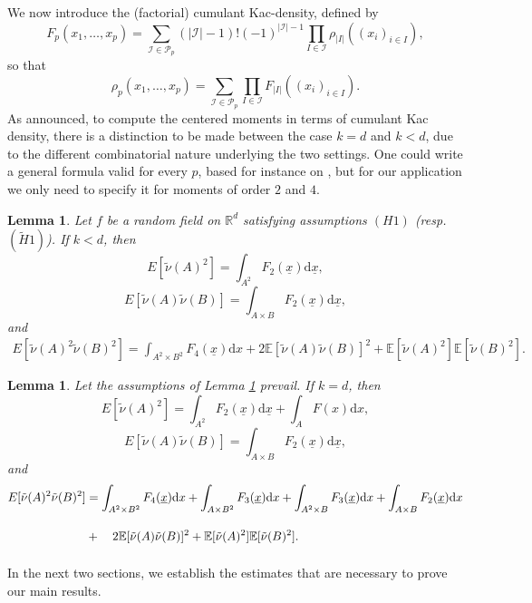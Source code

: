 \documentclass[11pt,a4paper]{article}
\newcommand\R{\mathbb{R}}
\newcommand\x{\underline{x}}
\newcommand\E{\mathbb{E}}
\newcommand\dd{\mathrm{d}}
\newcommand\I{\mathcal{I}}
\newcommand\nut{\tilde{\nu}}
\newcommand\Pt{\mathcal{P}}
\numberwithin{equation}{section}
\theoremstyle{plain}
\theoremstyle{plain}
\theoremstyle{plain}
\newtheorem{lemm}[theo]{Lemma}
\newenvironment{lemma}%
  {\begin{mdframed}[backgroundcolor=white]\begin{lemm}}%
  {\end{lemm}\par\vspace{0.cm}\end{mdframed}}
\theoremstyle{plain}
\theoremstyle{definition}
\theoremstyle{definition}
\begin{document}
We now introduce the (factorial) cumulant Kac-density, defined by 
\begin{equation}\label{e:Fp}
F_p(x_1,\ldots,x_p) = \sum_{\I\in \Pt_p}(|\I|-1)!(-1)^{|\I|-1}\prod_{I\in\I}\rho_{|I|}((x_i)_{i\in I}),
\end{equation}
so that
\[\rho_p(x_1,\ldots,x_p) = \sum_{\I\in \Pt_p}\prod_{I\in\I}F_{|I|}((x_i)_{i\in I}).\]
As announced, to compute the centered moments in terms of cumulant Kac density, there is a  distinction to be made between the case $k=d$ and $k<d$, due to the different combinatorial nature underlying the two settings. One could write a general formula valid for every $p$, based for instance on \cite[Prop. 3.5]{Gas21t}, but for our application we only need to specify it for moments of order $2$ and $4$.
\begin{lemma}
\label{lem1}
Let $f$ be a random field on $\R^d$ satisfying assumptions  $(H1)$ (resp. $(\widetilde{H}1)$). If $k<d$, then
\[E[\nut(A)^2] = \int_{A^2}F_2(\x)\dd \x,\]
\[E[\nut(A)\nut(B)] = \int_{A\times B} F_2(\x)\dd \x,\]
and
\begin{align*}
E[\nut(A)^2\nut(B)^2] = \int_{A^2\times B^2}F_4(\x)\dd x + 2\E[\nut(A)\nut(B)]^2 + \E[\nut(A)^2]\E[\nut(B)^2].
\end{align*}
\end{lemma}
\begin{lemma}
\label{lem2} Let the assumptions of Lemma \ref{lem1} prevail. If $k=d$, then
\[E[\nut(A)^2] = \int_{A^2}F_2(\x)\dd \x + \int_{A}F(x)\dd x,\]
\[E[\nut(A)\nut(B)] = \int_{A\times B} F_2(\x)\dd \x,\]
and
\begin{align*}
E[\nut(A)^2\nut(B)^2] &= \int_{A^2\times B^2}F_4(\x)\dd x + \int_{A\times B^2}F_3(\x)\dd x + \int_{A^2\times B}F_3(\x)\dd x + \int_{A\times B}F_2(\x)\dd x\\
&+\vphantom{\int^{\int}}\quad 2\E[\nut(A)\nut(B)]^2 + \E[\nut(A)^2]\E[\nut(B)^2].
\end{align*}
\end{lemma}

\smallskip

 In the next two sections, we establish the estimates that are necessary to prove our main results.
\end{document}
